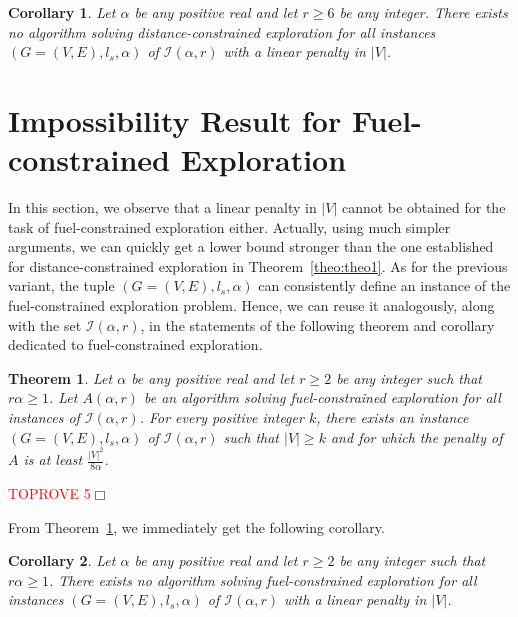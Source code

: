 \documentclass[11pt]{article}
\newtheorem{theorem}{Theorem}[section]
\newtheorem{corollary}{Corollary}[section]
\newcommand{\qed}{\hfill $\Box$ \bigbreak}
\newenvironment{proof}{\noindent {\bf Proof.}}{\qed}
\begin{document}
{\begin{corollary}
\label{col:col1}
Let $\alpha$ be any positive real and let $r\geq 6$ be any integer. There exists no algorithm solving distance-constrained exploration for all instances $(G=(V,E),l_s,\alpha)$ of $\mathcal{I}(\alpha,r)$ with a linear penalty in $|V|$.
\end{corollary}

\section{Impossibility Result for Fuel-constrained Exploration}

In this section, we observe that a linear penalty in $|V|$ cannot be obtained for the task of fuel-constrained exploration either. Actually, using much simpler arguments, we can quickly get a lower bound stronger than the one established for distance-constrained exploration in Theorem~\ref{theo:theo1}. As for the previous variant, the tuple $(G=(V,E),l_s,\alpha)$ can consistently define an instance of the fuel-constrained exploration problem. Hence, we can reuse it analogously, along with the set $\mathcal{I}(\alpha,r)$, in the statements of the following theorem and corollary dedicated to fuel-constrained exploration.

\begin{theorem}
\label{theo:theo2}
Let $\alpha$ be any positive real and let $r\geq 2$ be any integer such that $r\alpha\geq 1$. Let $A(\alpha,r)$ be an algorithm solving fuel-constrained exploration for all instances of $\mathcal{I}(\alpha,r)$. For every positive integer $k$, there exists an instance $(G=(V,E),l_s,\alpha)$ of $\mathcal{I}(\alpha,r)$ such that $|V|\geq k$ and for which the penalty of $A$ is at least $\frac{|V|^2}{8\alpha}$.
\end{theorem}

\begin{proof}\textcolor{red}{TOPROVE 5}\end{proof}

From Theorem~\ref{theo:theo2}, we immediately get the following corollary.

\begin{corollary}
\label{col:col2}
Let $\alpha$ be any positive real and let $r\geq 2$ be any integer such that $r\alpha\geq 1$. There exists no algorithm solving fuel-constrained exploration for all instances $(G=(V,E),l_s,\alpha)$ of $\mathcal{I}(\alpha,r)$ with a linear penalty in $|V|$.
\end{corollary}

}
\end{document}
